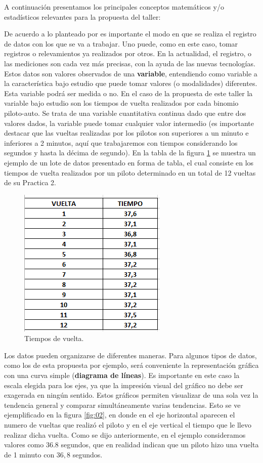 A continuación presentamos los principales conceptos matemáticos y/o estadísticos relevantes para la propuesta del taller:

De acuerdo a lo planteado por \textcite{ahumada15} es importante el modo en que se realiza el registro de datos con los que se va a trabajar. Uno puede, como en este caso, tomar registros o relevamientos ya realizados por otros. En la actualidad, el registro, o las mediciones son cada vez más precisas, con la ayuda de las nuevas tecnologías. Estos datos son valores observados de una \textbf{variable}, entendiendo como variable a la característica bajo estudio que puede tomar valores (o modalidades) diferentes. Esta variable podrá ser medida o no. En el caso de la propuesta de este taller la variable bajo estudio son los tiempos de vuelta realizados por cada binomio piloto-auto. Se trata de una variable cuantitativa continua dado que entre dos valores dados, la variable puede tomar cualquier valor intermedio (es importante destacar que las vueltas realizadas por los pilotos son superiores a un minuto e inferiores a 2 minutos, aquí que trabajaremos con tiempos considerando los segundos y hasta la décima de segundo). En la tabla de la figura \ref{fig:01} se muestra un ejemplo de un lote de datos presentado en forma de tabla, el cual consiste en los tiempos de vuelta realizados por un piloto determinado en un total de 12 vueltas de su Practica 2.


\begin{figure}[h!]
	\caption{Tiempos de vuelta.}
	\label{fig:01}
	\includegraphics[width=0.3\linewidth]{Trabajos/01/Anexos/01.png}
\end{figure}

Los datos pueden organizarse de diferentes maneras. Para algunos tipos de datos, como los de esta propuesta por ejemplo, será conveniente la representación gráfica con una curva simple (\textbf{diagrama de líneas}). Es importante en este caso la escala elegida para los ejes, ya que la impresión visual del gráfico no debe ser exagerada en ningún sentido. Estos gráficos permiten visualizar de una sola vez la tendencia general y comparar simultáneamente varias tendencias. Esto se ve ejemplificado en la figura \ref{fig:02}, en donde en el eje horizontal aparecen el numero de vueltas que realizó el piloto y en el eje vertical el tiempo que le llevo realizar dicha vuelta. Como se dijo anteriormente, en el ejemplo consideramos valores como $36.8$ segundos, que en realidad indican que un piloto hizo una vuelta de 1 minuto con $36,8$ segundos.

